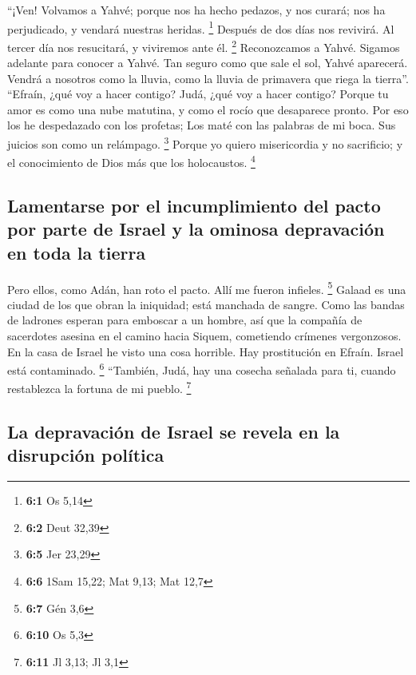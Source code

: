  ``¡Ven! Volvamos a Yahvé; porque nos ha hecho pedazos, y
nos curará; nos ha perjudicado, y vendará nuestras heridas. \footnote{\textbf{6:1}
  Os 5,14}  Después de dos días nos revivirá. Al tercer
día nos resucitará, y viviremos ante él. \footnote{\textbf{6:2} Deut
  32,39}  Reconozcamos a Yahvé. Sigamos adelante para
conocer a Yahvé. Tan seguro como que sale el sol, Yahvé aparecerá.
Vendrá a nosotros como la lluvia, como la lluvia de primavera que riega
la tierra''.  ``Efraín, ¿qué voy a hacer contigo? Judá,
¿qué voy a hacer contigo? Porque tu amor es como una nube matutina, y
como el rocío que desaparece pronto.  Por eso los he
despedazado con los profetas; Los maté con las palabras de mi boca. Sus
juicios son como un relámpago. \footnote{\textbf{6:5} Jer 23,29}
 Porque yo quiero misericordia y no sacrificio; y el
conocimiento de Dios más que los holocaustos. \footnote{\textbf{6:6}
  1Sam 15,22; Mat 9,13; Mat 12,7}

\hypertarget{lamentarse-por-el-incumplimiento-del-pacto-por-parte-de-israel-y-la-ominosa-depravaciuxf3n-en-toda-la-tierra}{%
\subsection{Lamentarse por el incumplimiento del pacto por parte de
Israel y la ominosa depravación en toda la
tierra}\label{lamentarse-por-el-incumplimiento-del-pacto-por-parte-de-israel-y-la-ominosa-depravaciuxf3n-en-toda-la-tierra}}

 Pero ellos, como Adán, han roto el pacto. Allí me fueron
infieles. \footnote{\textbf{6:7} Gén 3,6}  Galaad es una
ciudad de los que obran la iniquidad; está manchada de sangre.
 Como las bandas de ladrones esperan para emboscar a un
hombre, así que la compañía de sacerdotes asesina en el camino hacia
Siquem, cometiendo crímenes vergonzosos.  En la casa de
Israel he visto una cosa horrible. Hay prostitución en Efraín. Israel
está contaminado. \footnote{\textbf{6:10} Os 5,3} 
``También, Judá, hay una cosecha señalada para ti, cuando restablezca la
fortuna de mi pueblo. \footnote{\textbf{6:11} Jl 3,13; Jl 3,1}

\hypertarget{la-depravaciuxf3n-de-israel-se-revela-en-la-disrupciuxf3n-poluxedtica}{%
\subsection{La depravación de Israel se revela en la disrupción
política}\label{la-depravaciuxf3n-de-israel-se-revela-en-la-disrupciuxf3n-poluxedtica}}


